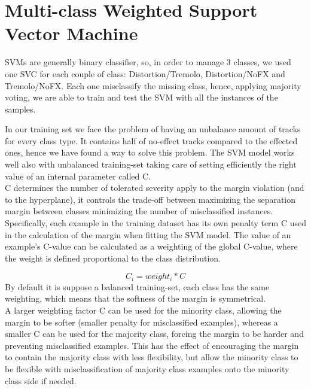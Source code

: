 \documentclass{article}
\begin{document}
\section{Multi-class Weighted Support Vector Machine}
SVMs are generally binary classifier, so, in order to manage 3 classes, we used one SVC for each couple of class: Distortion/Tremolo, Distortion/NoFX and Tremolo/NoFX. Each one misclassify the missing class, hence, applying majority voting, we are able to train and test the SVM with all the instances of the samples.

In our training set we face the problem of having an unbalance amount of tracks for every class type. It contains half of no-effect tracks compared to the effected ones, hence we have found a way to solve this problem. The SVM model works well also with unbalanced training-set taking care of setting efficiently the right value of an internal parameter called C.\\ C  determines the number of tolerated severity apply to the margin violation (and to the hyperplane), it controls the trade-off between maximizing the separation margin between classes minimizing the number of misclassified instances.
Specifically, each example in the training dataset has its own penalty term C used in the calculation of the margin when fitting the SVM model. The value of an example’s C-value can be calculated as a weighting of the global C-value, where the weight is defined proportional to the class distribution. 

$$C_i = weight_i * C$$
By default it is suppose a balanced training-set, each class has the same weighting, which means that the softness of the margin is symmetrical.\\ A larger weighting factor C can be used for the minority class, allowing the margin to be softer (smaller penalty for misclassified examples), whereas a smaller C can be used for the majority class, forcing the margin to be harder and preventing misclassified examples.
This has the effect of encouraging the margin to contain the majority class with less flexibility, but allow the minority class to be flexible with misclassification of majority class examples onto the minority class side if needed.
\end{document}
